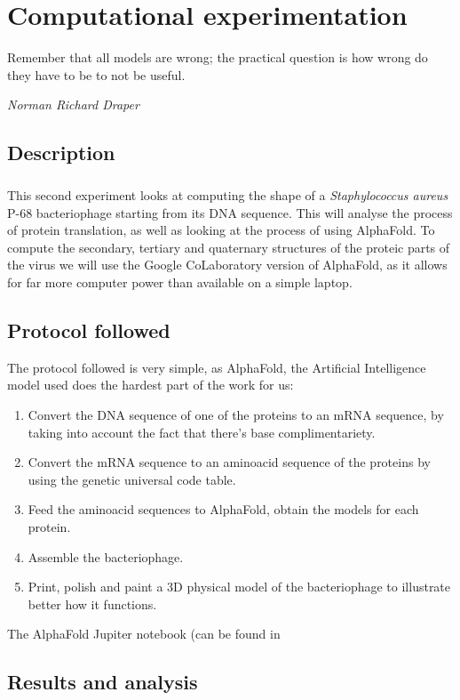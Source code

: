 \chapter{Computational experimentation}
\epigraph{Remember that all models are wrong; the practical question is how wrong do they have to be to not be useful.}{\textit{Norman Richard Draper}}
\section{Description}
\paragraph{}This second experiment looks at computing the shape of a \emph{Staphylococcus aureus} P-68 bacteriophage starting from its DNA sequence. This will analyse the process of protein translation, as well as looking at the process of using AlphaFold\cite{jumperHighlyAccurateProtein2021}. To compute the secondary, tertiary and quaternary structures of the proteic parts of the virus we will use the Google CoLaboratory version of AlphaFold\cite{GoogleColaboratoryAlpha1970}, as it allows for far more computer power than available on a simple laptop.
\section{Protocol followed}
The protocol followed is very simple, as AlphaFold, the Artificial Intelligence model used does the hardest part of the work for us:
\begin{enumerate}[label=\arabic*)]
\item Convert the DNA sequence of one of the proteins to an mRNA sequence, by taking into account the fact that there's base complimentariety.
\item Convert the mRNA sequence to an aminoacid sequence of the proteins by using the genetic universal code table.
\item Feed the aminoacid sequences to AlphaFold, obtain the models for each protein.
\item Assemble the bacteriophage. 
\item Print, polish and paint a 3D physical model of the bacteriophage to illustrate better how it functions.
\end{enumerate}
The AlphaFold Jupiter notebook (can be found in 
\section{Results and analysis}

